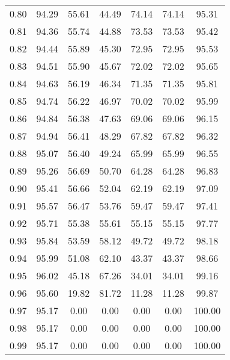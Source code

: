 \begin{tabular}{|c|c|c|c|c|c|c|}
      0.80 &     94.29 &     55.61 &      44.49 &   74.14 &      74.14 &         95.31 \\
      0.81 &     94.36 &     55.74 &      44.88 &   73.53 &      73.53 &         95.42 \\
      0.82 &     94.44 &     55.89 &      45.30 &   72.95 &      72.95 &         95.53 \\
      0.83 &     94.51 &     55.90 &      45.67 &   72.02 &      72.02 &         95.65 \\
      0.84 &     94.63 &     56.19 &      46.34 &   71.35 &      71.35 &         95.81 \\
      0.85 &     94.74 &     56.22 &      46.97 &   70.02 &      70.02 &         95.99 \\
      0.86 &     94.84 &     56.38 &      47.63 &   69.06 &      69.06 &         96.15 \\
      0.87 &     94.94 &     56.41 &      48.29 &   67.82 &      67.82 &         96.32 \\
      0.88 &     95.07 &     56.40 &      49.24 &   65.99 &      65.99 &         96.55 \\
      0.89 &     95.26 &     56.69 &      50.70 &   64.28 &      64.28 &         96.83 \\
      0.90 &     95.41 &     56.66 &      52.04 &   62.19 &      62.19 &         97.09 \\
      0.91 &     95.57 &     56.47 &      53.76 &   59.47 &      59.47 &         97.41 \\
      0.92 &     95.71 &     55.38 &      55.61 &   55.15 &      55.15 &         97.77 \\
      0.93 &     95.84 &     53.59 &      58.12 &   49.72 &      49.72 &         98.18 \\
      0.94 &     95.99 &     51.08 &      62.10 &   43.37 &      43.37 &         98.66 \\
      0.95 &     96.02 &     45.18 &      67.26 &   34.01 &      34.01 &         99.16 \\
      0.96 &     95.60 &     19.82 &      81.72 &   11.28 &      11.28 &         99.87 \\
      0.97 &     95.17 &      0.00 &       0.00 &    0.00 &       0.00 &        100.00 \\
      0.98 &     95.17 &      0.00 &       0.00 &    0.00 &       0.00 &        100.00 \\
      0.99 &     95.17 &      0.00 &       0.00 &    0.00 &       0.00 &        100.00 \\
\bottomrule
\end{tabular}
